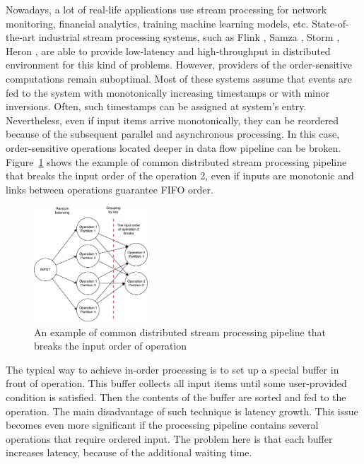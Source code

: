
\label {fs-intro}

Nowadays, a lot of real-life applications use stream processing for network monitoring, financial analytics, training machine learning models, etc. State-of-the-art industrial stream processing systems, such as Flink \cite{carbone2015apache}, Samza \cite{Noghabi:2017:SSS:3137765.3137770}, Storm \cite{apache:storm}, Heron \cite{Kulkarni:2015:THS:2723372.2742788}, are able to provide low-latency and high-throughput in distributed environment for this kind of problems. However, providers of the order-sensitive computations remain suboptimal. Most of these systems assume that events are fed to the system with monotonically increasing timestamps or with minor inversions. Often, such timestamps can be assigned at system's entry. Nevertheless, even if input items arrive monotonically, they can be reordered because of the subsequent parallel and asynchronous processing. In this case, order-sensitive operations located deeper in data flow pipeline can be broken. Figure~\ref{break-order-dataflow} shows the example of common distributed stream processing pipeline that breaks the input order of the operation 2, even if inputs are monotonic and links between operations guarantee FIFO order.

\begin{figure}[htbp]
  \centering
  \includegraphics[width=0.38\textwidth]{pics/break_order_pipeline}
  \caption{An example of common distributed stream processing pipeline that breaks the input order of operation}
  \label {break-order-dataflow}
\end{figure}

The typical way to achieve in-order processing is to set up a special buffer in front of operation. This buffer collects all input items until some user-provided condition is satisfied. Then the contents of the buffer are sorted and fed to the operation. The main disadvantage of such technique is latency growth. This issue becomes even more significant if the processing pipeline contains several operations that require ordered input. The problem here is that each buffer increases latency, because of the additional waiting time.

